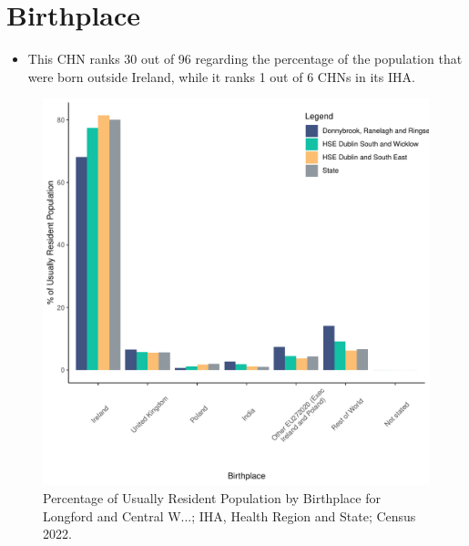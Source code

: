 \documentclass{article}
\begin{document}
\section{Birthplace}\label{sect:Birth}
\begin{itemize}
\item This CHN ranks  30 out of 96 regarding the percentage of the population that were born outside Ireland, while it ranks  1 out of 6 CHNs in its IHA.
\end{itemize}
\begin{figure}[H]
	\centering
	\includegraphics[width = 130mm]{../figures/BirthED.pdf}
	\caption{Percentage of Usually Resident Population by Birthplace for Longford and Central W...; IHA, Health Region and State; Census 2022.}
	\label{fig:vbnv}
	\end{figure}
	
\end{document}
